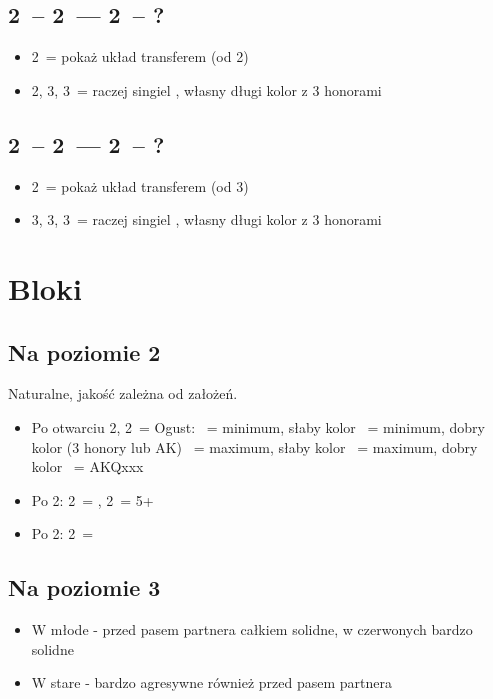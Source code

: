 \documentclass[12pt, a4paper]{article}
\begin{document}
\subsection*{2\clubs\ -- 2\diams\ --- 2\hearts\ -- ?}
\begin{itemize}
    \item 2\spades\ = pokaż układ transferem (od 2\nt)
    \item 2\nt, 3\clubs, 3\diams\ = raczej singiel \hearts, własny długi kolor z 3 honorami
\end{itemize}

\subsection*{2\clubs\ -- 2\diams\ --- 2\spades\ -- ?}
\begin{itemize}
    \item 2\nt\ = pokaż układ transferem (od 3\clubs)
    \item 3\clubs, 3\diams, 3\hearts\ = raczej singiel \spades, własny długi kolor z 3 honorami
\end{itemize}



\pagebreak
\section{Bloki}
\subsection*{Na poziomie 2}
Naturalne, jakość zależna od założeń.
\begin{itemize}
    \item Po otwarciu 2\diams, 2\nt\ = Ogust:
    \clubs\ = minimum, słaby kolor
    \diams\ = minimum, dobry kolor (3 honory lub AK)
    \hearts\ = maximum, słaby kolor
    \spades\ = maximum, dobry kolor
    \nt\ = AKQxxx
    \item Po 2\hearts: 2\spades\ = \lsf, 2\nt\ = 5+\spades\ \fonce
    \item Po 2\spades: 2\nt\ = \lsf
\end{itemize}

\subsection*{Na poziomie 3}
\begin{itemize}
    \item W młode - przed pasem partnera całkiem solidne, w czerwonych bardzo solidne
    \item W stare - bardzo agresywne również przed pasem partnera
\end{itemize}
\end{document}
